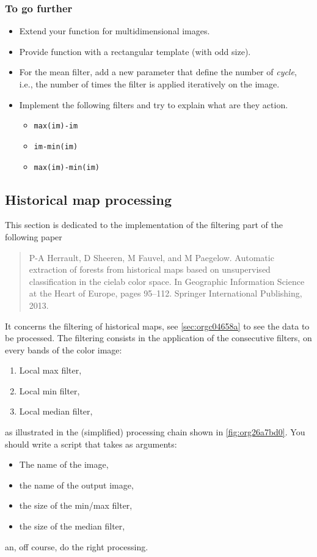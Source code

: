 \documentclass[a4paper,11pt,DIV=18]{scrartcl}
\begin{document}
\subsubsection{To go further}
\label{sec:orgb6ab60f}
\begin{itemize}
\item Extend your function for multidimensional images.
\item Provide function with a rectangular template (with odd size).
\item For the mean filter, add a new parameter that define the number of
\emph{cycle}, i.e., the number of times the filter is applied iteratively
on the image.
\item Implement the  following filters  and try to  explain what  are they
action.
\begin{itemize}
\item \texttt{max(im)-im}
\item \texttt{im-min(im)}
\item \texttt{max(im)-min(im)}
\end{itemize}
\end{itemize}
\subsection{Historical map processing}
\label{sec:orgddfd94b}
This section is dedicated to the implementation of the filtering part of the following paper 
\begin{quote}
P-A  Herrault,  D  Sheeren,  M   Fauvel,  and  M  Paegelow.  Automatic
extraction  of  forests from  historical  maps  based on  unsupervised
classification in  the cielab  color space. In  Geographic Information
Science at the Heart of  Europe, pages 95--112. Springer International
Publishing, 2013.
\end{quote}

It concerns the filtering of  historical maps, see \ref{sec:orgc04658a} to see
the data to be processed. The filtering consists in the application of
the consecutive filters, on every bands of the color image:
\begin{enumerate}
\item Local max filter,
\item Local min filter,
\item Local median filter,
\end{enumerate}
as  illustrated   in  the  (simplified)  processing   chain  shown  in
\ref{fig:org26a7bd0}. You should write a script that takes as arguments:
\begin{itemize}
\item The name of the image,
\item the name of the output image,
\item the size of the min/max filter,
\item the size of the median filter,
\end{itemize}
an, off course, do the right processing.
\end{document}
